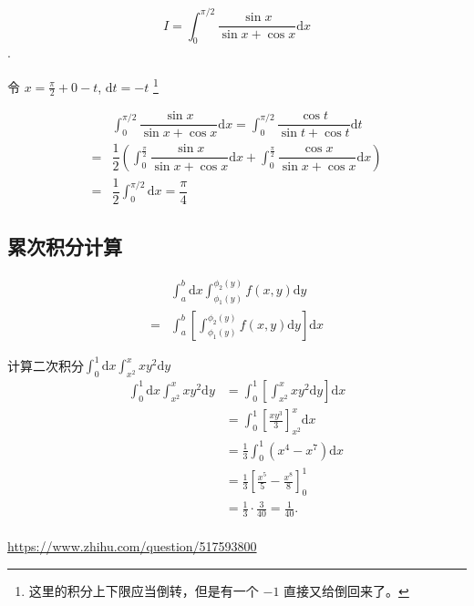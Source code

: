 \begin{example}
    \[
        I = \int _0^{\pi/2} \dfrac{\sin x}{\sin x + \cos x} \mathrm{d}x 
    \]
    \cite[page 111, pdf 122, example 10]{we}.

    令 $x = \frac{\pi}{2} + 0 - t$, $\mathrm{d}t = -t$
    \footnote{这里的积分上下限应当倒转，但是有一个 $-1$ 直接又给倒回来了。}

    \begin{align*}
        &\int_0^{\pi/2} \dfrac{\sin x}{\sin x + \cos x} \mathrm{d}x 
        = \int_0^{\pi/2} \dfrac{\cos t}{\sin t + \cos t} \mathrm{d}t \\ 
        = &\dfrac{1}{2} 
        \left(
            \int_0^{\frac{\pi}{2}} 
            \dfrac{\sin x}{\sin x + \cos x} \mathrm{d}x 
            + \int_0^{\frac{\pi}{2}} 
            \dfrac{\cos x}{\sin x + \cos x} \mathrm{d}x
        \right) \\
        = &\dfrac{1}{2} \int_0^{\pi/2} \mathrm{d}x = \dfrac{\pi}{4}
    \end{align*}
\end{example}

\subsection{累次积分计算}

\begin{definition}[累次积分交换次序]
    \begin{align*}
         &\int_a^b \mathrm{d}x \int_{\phi_1(y)}^{\phi_2(y)} 
         f(x, y) \mathrm{d}y \\[1em]
        =&\int_a^b
        \left[
            \int_{\phi_1(y)}^{\phi_2(y)} f(x, y) \mathrm{d}y
        \right] \mathrm{d}x
    \end{align*}
\end{definition}

\begin{example}
    计算二次积分$\int_0^1 \mathrm{d}x \int_{x^2}^{x} xy^2 \mathrm{d}y$
    \begin{align*} 
        \int_{0}^{1} \text{d}x \int_{x^2}^{x} xy^2 \text{d}y 
        &= \int_{0}^{1} 
        \left[ 
            \int_{x^2}^{x} xy^2 \text{d}y 
        \right] 
        \text{d}x \\
        &= \int_{0}^{1} 
        \left[ 
            \frac{xy^3}{3} 
        \right]_{x^2}^{x} \text{d}x \\ 
        &= \frac{1}{3} \int_{0}^{1} (x^4 - x^7) \text{d}x \\
        &= \frac{1}{3} 
        \left[ 
            \frac{x^5}{5} - \frac{x^8}{8} 
        \right]_{0}^{1} \\ 
        &= \frac{1}{3} \cdot \frac{3}{40} = \frac{1}{40}. \\ 
    \end{align*}

    \url{https://www.zhihu.com/question/517593800}
\end{example}

